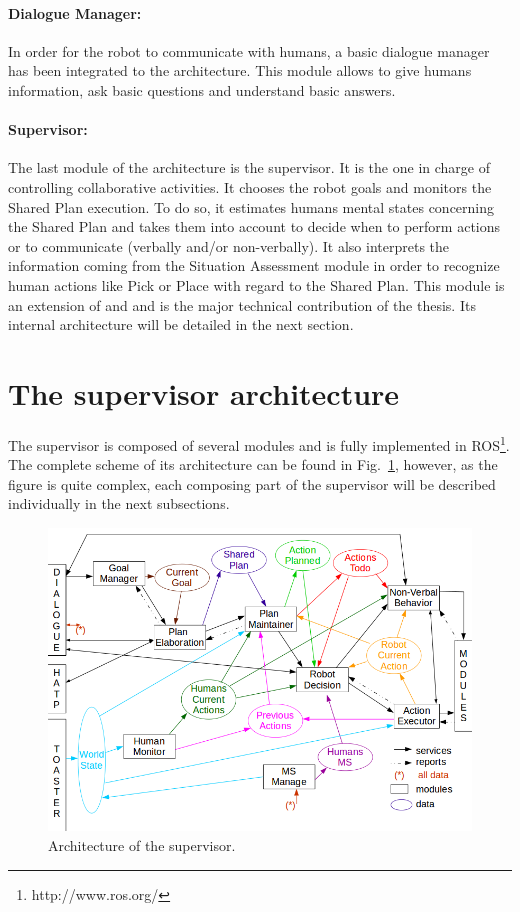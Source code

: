 \documentclass[english,a4paper,11pt,twoside]{StyleThese}
\begin{document}
\paragraph{Dialogue Manager:}
In order for the robot to communicate with humans, a basic dialogue manager has been integrated to the architecture. This module allows to give humans information, ask basic questions and understand basic answers.

\paragraph{Supervisor:}
The last module of the architecture is the supervisor. It is the one in charge of controlling collaborative activities. It chooses the robot goals and monitors the Shared Plan execution. To do so, it estimates humans mental states concerning the Shared Plan and takes them into account to decide when to perform actions or to communicate (verbally and/or non-verbally). It also interprets the information coming from the Situation Assessment module in order to recognize human actions like Pick or Place with regard to the Shared Plan. This module is an extension of \cite{clodic2009shary} and \cite{fiore2016planning} and is the major technical contribution of the thesis. Its internal architecture will be detailed in the next section.

\section{The supervisor architecture}

The supervisor is composed of several modules and is fully implemented in ROS\footnote{http://www.ros.org/}. The complete scheme of its architecture can be found in Fig.~\ref{fig:archiSup}, however, as the figure is quite complex, each composing part of the supervisor will be described individually in the next subsections. 

\begin{figure}[!h]
	\centering
    \includegraphics[width=\textwidth]{figs/Chapter2/ArchiSup.png}
    \caption{Architecture of the supervisor.}
    \label{fig:archiSup}
\end{figure}
\end{document}
